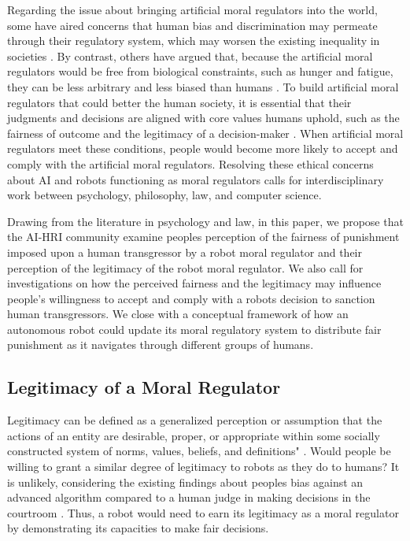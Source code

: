 \documentclass{article} %
\begin{document}
Regarding the issue about bringing artificial moral regulators into the world, some have aired concerns that human bias and discrimination may permeate through their regulatory system, which may worsen the existing inequality in societies \cite{o2016weapons,sourdin2018judge}. By contrast, others have argued that, because the artificial moral regulators would be free from biological constraints, such as hunger and fatigue, they can be less arbitrary and less biased than humans \cite{sourdin2018judge}. To build artificial moral regulators that could better the human society, it is essential that their judgments and decisions are aligned with core values humans uphold, such as the fairness of outcome \cite{von1990proportionality} and the legitimacy of a decision-maker \cite{tyler2006psychological}. When artificial moral regulators meet these conditions, people would become more likely to accept and comply with the artificial moral regulators. Resolving these ethical concerns about AI and robots functioning as moral regulators calls for interdisciplinary work between psychology, philosophy, law, and computer science.

Drawing from the literature in psychology and law, in this paper, we propose that the AI-HRI community examine peoples perception of the fairness of punishment imposed upon a human transgressor by a robot moral regulator and their perception of the legitimacy of the robot moral regulator. We also call for investigations on how the perceived fairness and the legitimacy may influence people's willingness to accept and comply with a robots decision to sanction human transgressors. We close with a conceptual framework of how an autonomous robot could update its moral regulatory system to distribute fair punishment as it navigates through different groups of humans.

\subsection{Legitimacy of a Moral Regulator}
Legitimacy can be defined as a generalized perception or assumption that the actions of an entity are desirable, proper, or appropriate within some socially constructed system of norms, values, beliefs, and definitions" \cite[p. 574]{suchman1995managing}. Would people be willing to grant a similar degree of legitimacy to robots as they do to humans? It is unlikely, considering the existing findings about peoples bias against an advanced algorithm compared to a human judge in making decisions in the courtroom \cite{chen2021having}. Thus, a robot would need to earn its legitimacy as a moral regulator by demonstrating its capacities to make fair decisions.
\end{document}
